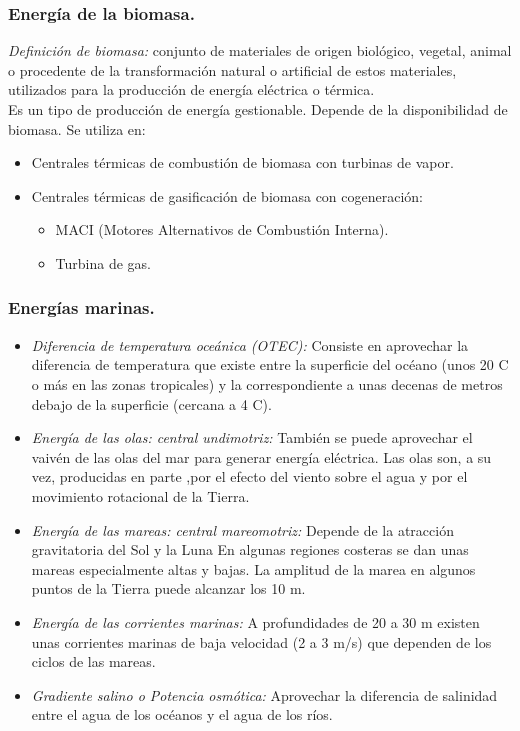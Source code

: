 			\subsubsection{Energía de la biomasa.}
				\textit{Definición de biomasa:} conjunto de materiales de origen biológico, vegetal, animal o procedente de
				la transformación natural o artificial de estos materiales, utilizados para la producción de energía
				eléctrica o térmica.\\
				\indent Es un tipo de producción de energía gestionable. Depende de la disponibilidad de biomasa. Se utiliza en:	
				\begin{itemize}
					\item Centrales térmicas de combustión de biomasa con turbinas de vapor.
					\item Centrales térmicas de gasificación de biomasa con cogeneración:
					\begin{itemize}
						\item MACI (Motores Alternativos de Combustión Interna).
						\item Turbina de gas.
					\end{itemize}
				\end{itemize}
				
			\subsubsection{Energías marinas.}
				\begin{itemize}
					\item \textit{Diferencia de temperatura oceánica (OTEC):} 
						Consiste en aprovechar la diferencia de temperatura que existe entre la superficie del océano (unos 20 \textdegree C o más en las zonas tropicales) y la correspondiente a unas decenas de metros debajo de la superficie (cercana a 4 \textdegree C).
					\item \textit{Energía de las olas: central undimotriz:}
						También se puede aprovechar el vaivén de las olas del mar para generar energía eléctrica. Las olas son, a
						su vez, producidas en parte ,por el efecto del viento sobre el agua y por el movimiento rotacional de la Tierra.
					\item \textit{Energía de las mareas: central mareomotriz:}
						Depende de la atracción gravitatoria del Sol y la Luna En algunas regiones costeras se dan unas mareas
						especialmente altas y bajas. La amplitud de la marea en algunos puntos de la Tierra puede alcanzar los 10 m.
					\item \textit{Energía de las corrientes marinas:}
						A profundidades de 20 a 30 m existen unas corrientes marinas de baja velocidad (2 a 3 m/s) que dependen de
						los ciclos de las mareas.
					\item \textit{Gradiente salino o Potencia osmótica:}
						Aprovechar la diferencia de salinidad entre el agua de los océanos y el agua de los ríos.
				\end{itemize}
				
